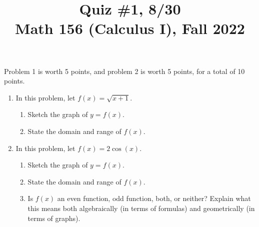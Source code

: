 \documentclass[11pt]{article}
\title{Quiz \#1, 8/30 \\ Math 156 (Calculus I), Fall 2022}
\date{}
\begin{document}
\maketitle

\thispagestyle{empty}

\vspace{-1cm}

Problem 1 is worth 5 points, and problem 2 is worth 5 points, for a total of 10 points.

\begin{enumerate}
\item In this problem, let $f(x) = \sqrt{x+1}$.
\begin{enumerate}
\item Sketch the graph of $y=f(x)$.
\item State the domain and range of $f(x)$.
\end{enumerate}

\vspace{5cm}

\item In this problem, let $f(x) = 2\cos(x)$.
\begin{enumerate}
\item Sketch the graph of $y=f(x)$.
\item State the domain and range of $f(x)$.
\item Is $f(x)$ an even function, odd function, both, or neither? Explain what this means both algebraically (in terms of formulas) and geometrically (in terms of graphs).
\end{enumerate}

\end{enumerate}
\end{document}
